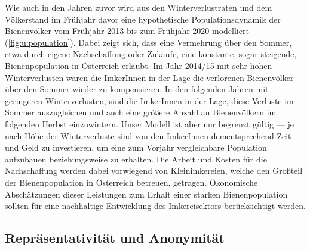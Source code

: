 Wie auch in den Jahren zuvor wird aus den Winterverlustraten und dem Völkerstand im Frühjahr davor eine hypothetische Populationsdynamik der Bienenvölker vom Frühjahr 2013 bis zum Frühjahr 2020 modelliert (\cref{fig:u:population}). Dabei zeigt sich, dass eine Vermehrung über den Sommer, etwa durch eigene Nachschaffung oder Zukäufe, eine konstante, sogar steigende, Bienenpopulation in Österreich erlaubt.
\newline
Im Jahr 2014/15 mit sehr hohen Winterverlusten waren die ImkerInnen in der Lage die verlorenen Bienenvölker über den Sommer wieder zu kompensieren. In den folgenden Jahren mit geringeren Winterverlusten, sind die ImkerInnen in der Lage, diese Verluste im Sommer auszugleichen und auch eine größere Anzahl an Bienenvölkern im folgenden Herbst einzuwintern.
\newline
Unser Modell ist aber nur begrenzt gültig --- je nach Höhe der Winterverluste sind von den ImkerInnen dementsprechend Zeit und Geld zu investieren, um eine zum Vorjahr vergleichbare Population  aufzubauen beziehungsweise zu erhalten. Die Arbeit und Kosten für die Nachschaffung werden dabei vorwiegend von Kleinimkereien, welche den Großteil der Bienenpopulation in Österreich betreuen, getragen. Ökonomische Abschätzungen dieser Leistungen zum Erhalt einer starken Bienenpopulation sollten für eine nachhaltige Entwicklung des Imkereisektors berücksichtigt werden.

\subsection{Repräsentativität und Anonymität}

